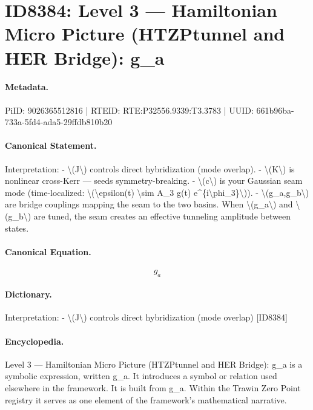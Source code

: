 \section*{ID8384: Level 3 — Hamiltonian Micro Picture (HTZPtunnel and HER Bridge): g\_a}
\paragraph{Metadata.}
PiID: 9026365512816 | RTEID: RTE:P32556.9339:T3.3783 | UUID: 661b96ba-733a-5fd4-ada5-29ffdb810b20

\paragraph{Canonical Statement.}
Interpretation: - \textbackslash{}(J\textbackslash{}) controls direct hybridization (mode overlap). - \textbackslash{}(K\textbackslash{}) is nonlinear cross-Kerr — seeds symmetry-breaking. - \textbackslash{}(c\textbackslash{}) is your Gaussian seam mode (time-localized: \textbackslash{}(\textbackslash{}epsilon(t) \textbackslash{}sim A\_3 g(t) e\textasciicircum{}\{i\textbackslash{}phi\_3\}\textbackslash{})). - \textbackslash{}(g\_a,g\_b\textbackslash{}) are bridge couplings mapping the seam to the two basins. When \textbackslash{}(g\_a\textbackslash{}) and \textbackslash{}(g\_b\textbackslash{}) are tuned, the seam creates an effective tunneling amplitude between states.

\paragraph{Canonical Equation.}
\[
g_a
\]

\paragraph{Dictionary.}
Interpretation: - \textbackslash{}(J\textbackslash{}) controls direct hybridization (mode overlap) [ID8384]

\paragraph{Encyclopedia.}
Level 3 — Hamiltonian Micro Picture (HTZPtunnel and HER Bridge): g\_a is a symbolic expression, written g\_a. It introduces a symbol or relation used elsewhere in the framework. It is built from g\_a. Within the Trawin Zero Point registry it serves as one element of the framework's mathematical narrative.
